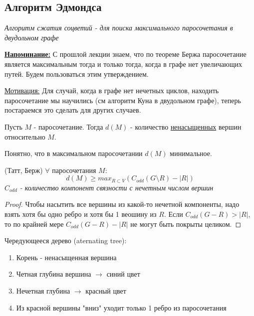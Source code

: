 
\subsection{Алгоритм Эдмондса}

\textit{Алгоритм сжатия соцветий - для поиска максимального паросочетания в двудольном графе}

\textbf{\underline{Напоминание:}}
С прошлой лекции знаем, что по теореме Бержа паросочетание является максимальным тогда и только тогда, когда в графе нет увеличающих путей. Будем пользоваться этим утверждением.

\underline{Мотивация:} Для случай, когда в графе нет нечетных циклов, находить паросочетание мы научились (см алгоритм Куна в двудольном графе), теперь постараемся это сделать для других случаев.

\begin{definition}
  Пусть $M$ - паросочетание. Тогда $d(M)$ - количество \underline{ненасыщенных} вершин относительно $M$.
\end{definition}
\begin{note}
 Понятно, что в максимальном паросочетании $d(M)$ минимальное.
\end{note}
\begin{lemma}{(Татт, Берж)}
  $\forall$ паросочетания $M$:
  $$d(M) \ge max_{R \subset V} (C_{odd}(G \setminus R) - |R|)$$
  \textit{$C_{odd}$ - количество компонент связности с нечетным числом вершин}
\end{lemma}

\begin{proof}
Чтобы насытить все вершины из какой-то нечетной компоненты, надо взять хотя бы одно ребро и хотя бы 1 веошину из $R$. Если $C_{odd}(G - R) > |R|$, то по крайней мере $C_{odd}(G - R) - |R|$ не могут быть покрыты целиком.
\end{proof}

\begin{definition}
  Чередующееся дерево (aternating tree):
  \begin{enumerate}
    \item Корень - ненасыщенная вершина
    \item Четная глубина вершина $\to$ синий цвет
    \item Нечетная глубина $\to$ красный цвет
    \item Из красной вершины "вниз" уходит только 1 ребро из паросочетания
  \end{enumerate}
\end{definition}

